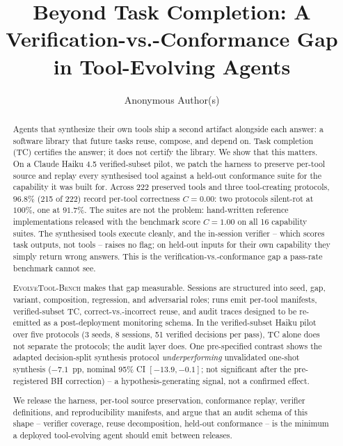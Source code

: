 \documentclass[sigconf,anonymous,natbib=false]{acmart}
\begin{document}
\title{Beyond Task Completion: A Verification-vs.-Conformance Gap in Tool-Evolving Agents}

\author{Anonymous Author(s)}

\begin{abstract}
Agents that synthesize their own tools ship a second artifact alongside each answer: a software library that future tasks reuse, compose, and depend on. Task completion (TC) certifies the answer; it does not certify the library. We show that this matters. On a Claude Haiku 4.5 verified-subset pilot, we patch the harness to preserve per-tool source and replay every synthesised tool against a held-out conformance suite for the capability it was built for. Across 222 preserved tools and three tool-creating protocols, $96.8\%$ (215 of 222) record per-tool correctness $C{=}0.00$: two protocols silent-rot at $100\%$, one at $91.7\%$. The suites are not the problem: hand-written reference implementations released with the benchmark score $C{=}1.00$ on all 16 capability suites. The synthesised tools execute cleanly, and the in-session verifier -- which scores task outputs, not tools -- raises no flag; on held-out inputs for their own capability they simply return wrong answers. This is the verification-vs.-conformance gap a pass-rate benchmark cannot see.

\textsc{EvolveTool-Bench} makes that gap measurable. Sessions are structured into seed, gap, variant, composition, regression, and adversarial roles; runs emit per-tool manifests, verified-subset TC, correct-vs.-incorrect reuse, and audit traces designed to be re-emitted as a post-deployment monitoring schema. In the verified-subset Haiku pilot over five protocols (3 seeds, 8 sessions, 51 verified decisions per pass), TC alone does not separate the protocols; the audit layer does. One pre-specified contrast shows the adapted decision-split synthesis protocol \emph{underperforming} unvalidated one-shot synthesis ($-7.1$~pp, nominal 95\% CI $[-13.9,-0.1]$; not significant after the pre-registered BH correction) -- a hypothesis-generating signal, not a confirmed effect.

We release the harness, per-tool source preservation, conformance replay, verifier definitions, and reproducibility manifests, and argue that an audit schema of this shape -- verifier coverage, reuse decomposition, held-out conformance -- is the minimum a deployed tool-evolving agent should emit between releases.
\end{abstract}
\end{document}
